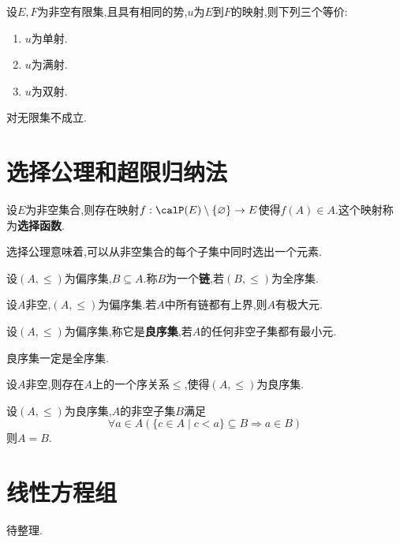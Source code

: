 \begin{thm}
    设$E, F$为非空有限集,且具有相同的势,$u$为$E$到$F$的映射,则下列三个等价:
    \begin{enumerate}
        \item $u$为单射.
        \item $u$为满射.
        \item $u$为双射.
    \end{enumerate}
\end{thm}

\begin{rqq}
    对无限集不成立.
\end{rqq}

\section{选择公理和超限归纳法}

\begin{thm}[选择公理]
    设$E$为非空集合,则存在映射$f: \calP(E) \setminus \{ \varnothing \} \to E$使得$f(A) \in A$.这个映射称为\textbf{选择函数}.
\end{thm}

\begin{rqq}
    选择公理意味着,可以从非空集合的每个子集中同时选出一个元素.
\end{rqq}

\begin{deff}
    设$(A, \leqslant)$为偏序集,$B \subseteq A$.称$B$为一个\textbf{链},若$(B, \leqslant)$为全序集.
\end{deff}

\begin{thm}[Zorn引理]
    设$A$非空,$(A, \leqslant)$为偏序集.若$A$中所有链都有上界,则$A$有极大元.
\end{thm}

\begin{deff}
    设$(A, \leqslant)$为偏序集,称它是\textbf{良序集},若$A$的任何非空子集都有最小元.
\end{deff}

\begin{prop}
    良序集一定是全序集.
\end{prop}

\begin{thm}[良序原理]
    设$A$非空,则存在$A$上的一个序关系$\leqslant$,使得$(A, \leqslant)$为良序集.
\end{thm}

\begin{thm}[超限归纳法]
    设$(A, \leqslant)$为良序集,$A$的非空子集$B$满足\[ \forall a \in A ( \{ c \in A \mid c < a \} \subseteq B \Rightarrow a \in B ) \]则$A = B$.
\end{thm}

\section{线性方程组}

待整理.